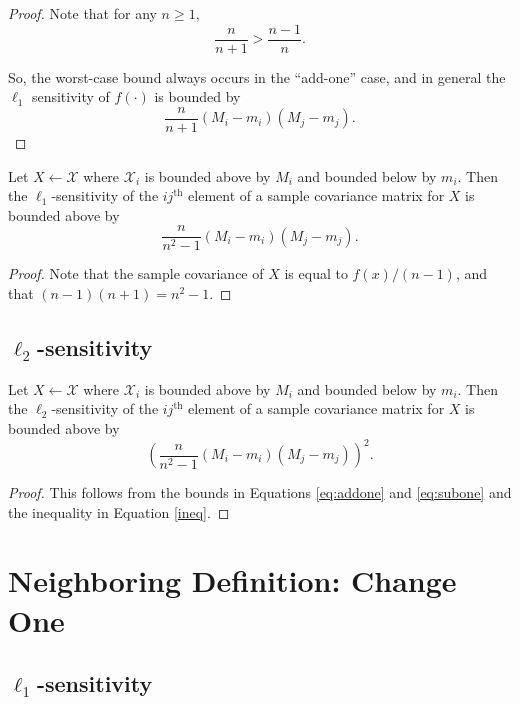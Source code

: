 \documentclass[11pt]{scrartcl} %
\begin{document}
\begin{proof}
Note that for any $n \ge 1$,
	\begin{equation}
	\label{ineq}
	 \frac{n}{n + 1} > \frac{n-1}{n}.
	\end{equation}

So, the worst-case bound always occurs in the ``add-one'' case, and in general the  $\ell_1$ sensitivity of $f(\cdot)$ is bounded by
 $$ \frac{n}{n+1}  (M_i - m_i)(M_j - m_j).$$ 
\end{proof}

\begin{corollary}
Let $X \leftarrow \mathcal{X}$ where $\mathcal{X}_i$ is bounded above by $M_i$ and bounded below by $m_i$. Then the $\ell_1$-sensitivity of the $ij^{\text{th}}$ element of a sample covariance matrix for $X$ is bounded above by 
$$ \frac{n}{n^2-1}(M_i - m_i)(M_j - m_j).$$
\end{corollary}

\begin{proof}
Note that the sample covariance of $X$ is equal to $f(x)/(n-1)$, and that $(n-1)(n+1) = n^2 -1$.
\end{proof}

\subsection{$\ell_2$-sensitivity}

\begin{theorem}
Let $X \leftarrow \mathcal{X}$ where $\mathcal{X}_i$ is bounded above by $M_i$ and bounded below by $m_i$. Then the $\ell_2$-sensitivity of the $ij^{\text{th}}$ element of a sample covariance matrix for $X$ is bounded above by
$$\left(\frac{n}{n^2-1}(M_i - m_i)(M_j - m_j)\right)^2.$$
\end{theorem}

\begin{proof}
This follows from the bounds in Equations \ref{eq:addone} and \ref{eq:subone} and the inequality in Equation \ref{ineq}.
\end{proof}

\section{Neighboring Definition: Change One}
\subsection{$\ell_1$-sensitivity}
\end{document}
